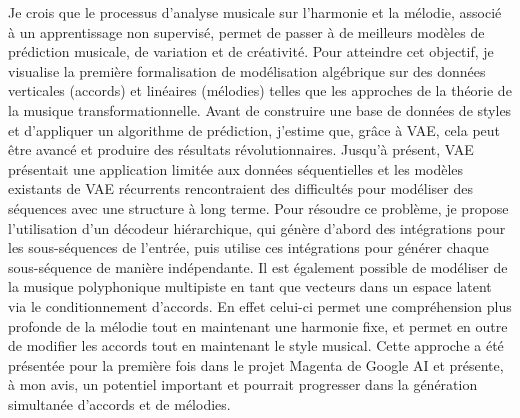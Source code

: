 Je crois que le processus d'analyse musicale sur l'harmonie et la mélodie, associé à un apprentissage non supervisé, permet de passer à de meilleurs modèles de prédiction musicale, de variation et de créativité. Pour atteindre cet objectif, je visualise la première formalisation de modélisation algébrique sur des données verticales (accords) et linéaires (mélodies) telles que les approches de la théorie de la musique transformationnelle. Avant de construire une base de données de styles et d’appliquer un algorithme de prédiction, j’estime que, grâce à VAE, cela peut être avancé et produire des résultats révolutionnaires.
Jusqu'à présent, VAE présentait une application limitée aux données séquentielles et les modèles existants de VAE récurrents rencontraient des difficultés pour modéliser des séquences avec une structure à long terme. Pour résoudre ce problème, je propose l’utilisation d’un décodeur hiérarchique, qui génère d’abord des intégrations pour les sous-séquences de l’entrée, puis utilise ces intégrations pour générer chaque sous-séquence de manière indépendante. Il est également possible de modéliser de la musique polyphonique multipiste en tant que vecteurs dans un espace latent via le conditionnement d'accords. En effet celui-ci permet une compréhension plus profonde de la mélodie tout en maintenant une harmonie fixe, et permet en outre de modifier les accords tout en maintenant le style musical. Cette approche a été présentée pour la première fois dans le projet Magenta de Google AI et présente, à mon avis, un potentiel important et pourrait progresser dans la génération simultanée d'accords et de mélodies.

